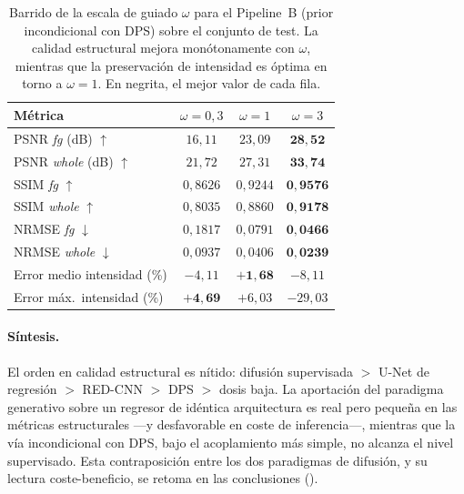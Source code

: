 \begin{table}[h!]
    \centering
    \small
    \begin{tabular}{lccc}
        \toprule
        Métrica & $\omega = 0{,}3$ & $\omega = 1$ & $\omega = 3$ \\
        \midrule
        PSNR \textit{fg} (dB) $\uparrow$ & $16{,}11$ & $23{,}09$ & $\mathbf{28{,}52}$ \\
        PSNR \textit{whole} (dB) $\uparrow$ & $21{,}72$ & $27{,}31$ & $\mathbf{33{,}74}$ \\
        SSIM \textit{fg} $\uparrow$ & $0{,}8626$ & $0{,}9244$ & $\mathbf{0{,}9576}$ \\
        SSIM \textit{whole} $\uparrow$ & $0{,}8035$ & $0{,}8860$ & $\mathbf{0{,}9178}$ \\
        NRMSE \textit{fg} $\downarrow$ & $0{,}1817$ & $0{,}0791$ & $\mathbf{0{,}0466}$ \\
        NRMSE \textit{whole} $\downarrow$ & $0{,}0937$ & $0{,}0406$ & $\mathbf{0{,}0239}$ \\
        Error medio intensidad (\%) & $-4{,}11$ & $\mathbf{+1{,}68}$ & $-8{,}11$ \\
        Error máx.\ intensidad (\%) & $\mathbf{+4{,}69}$ & $+6{,}03$ & $-29{,}03$ \\
        \bottomrule
    \end{tabular}
    \caption{Barrido de la escala de guiado $\omega$ para el
    Pipeline~B (prior incondicional con DPS) sobre el conjunto de
    test. La calidad estructural mejora monótonamente con $\omega$,
    mientras que la preservación de intensidad es óptima en torno a
    $\omega = 1$. En negrita, el mejor valor de cada fila.}
    \label{tab:pet-omega}
\end{table}

\paragraph{Síntesis.}
El orden en calidad estructural es nítido: difusión supervisada
$>$ U-Net de regresión $>$ RED-CNN $>$ DPS $>$ dosis baja. La
aportación del paradigma generativo sobre un regresor de idéntica
arquitectura es real pero pequeña en las métricas estructurales —y
desfavorable en coste de inferencia—, mientras que la vía
incondicional con DPS, bajo el acoplamiento más simple, no alcanza
el nivel supervisado. Esta contraposición entre los dos paradigmas
de difusión, y su lectura coste-beneficio, se retoma en las
conclusiones ().

